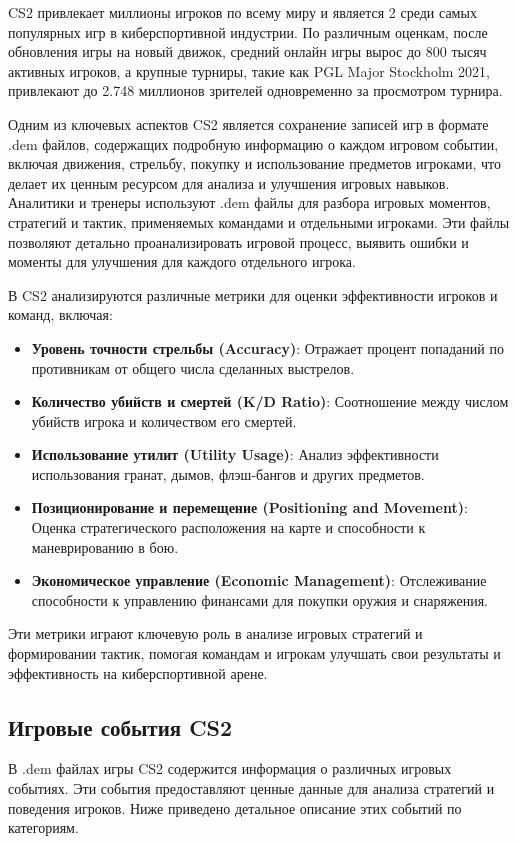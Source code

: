 CS2 привлекает миллионы игроков по всему миру и является 2 среди самых популярных игр в киберспортивной индустрии. По различным оценкам, после обновления игры на новый движок, средний онлайн игры вырос до 800 тысяч активных игроков, а крупные турниры, такие как PGL Major Stockholm 2021, привлекают до 2.748 миллионов зрителей одновременно за просмотром турнира.

Одним из ключевых аспектов CS2 является сохранение записей игр в формате .dem файлов, содержащих подробную информацию о каждом игровом событии, включая движения, стрельбу, покупку и использование предметов игроками, что делает их ценным ресурсом для анализа и улучшения игровых навыков. Аналитики и тренеры используют .dem файлы для разбора игровых моментов, стратегий и тактик, применяемых командами и отдельными игроками. Эти файлы позволяют детально проанализировать игровой процесс, выявить ошибки и моменты для улучшения для каждого отдельного игрока.

В CS2 анализируются различные метрики для оценки эффективности игроков и команд, включая:

\begin{itemize}
	\item \textbf{Уровень точности стрельбы (Accuracy)}:
	Отражает процент попаданий по противникам от общего числа сделанных выстрелов.
	\item \textbf{Количество убийств и смертей (K/D Ratio)}:
	Соотношение между числом убийств игрока и количеством его смертей.
	\item \textbf{Использование утилит (Utility Usage)}:
	Анализ эффективности использования гранат, дымов, флэш-бангов и других предметов.
	\item \textbf{Позиционирование и перемещение (Positioning and Movement)}:
	Оценка стратегического расположения на карте и способности к маневрированию в бою.
	\item \textbf{Экономическое управление (Economic Management)}:
	Отслеживание способности к управлению финансами для покупки оружия и снаряжения.
\end{itemize}

Эти метрики играют ключевую роль в анализе игровых стратегий и формировании тактик, помогая командам и игрокам улучшать свои результаты и эффективность на киберспортивной арене.
\subsection{Игровые события CS2}

В .dem файлах игры CS2 содержится информация о различных игровых событиях. Эти события предоставляют ценные данные для анализа стратегий и поведения игроков. Ниже приведено детальное описание этих событий по категориям.

